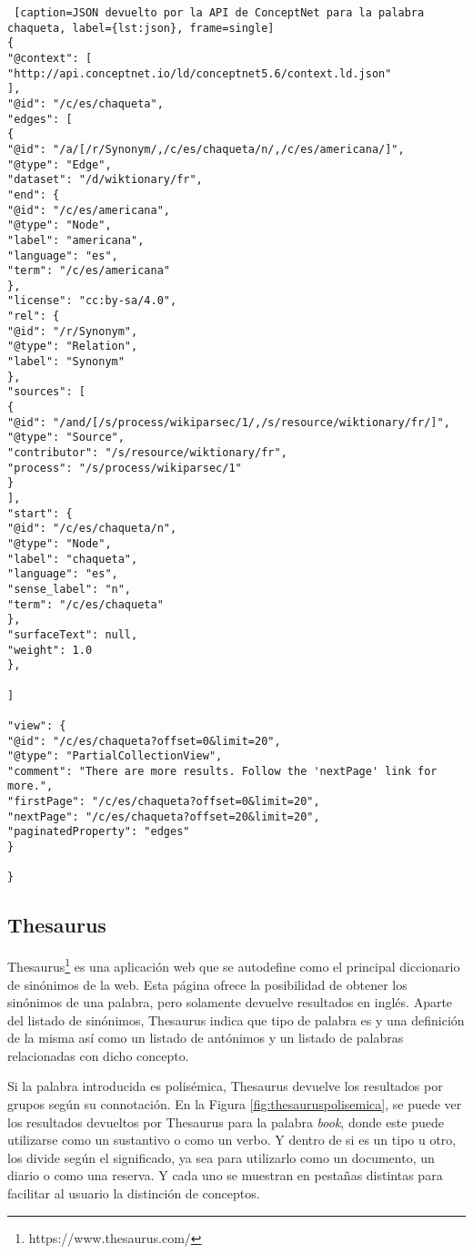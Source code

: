 \begin{lstlisting} [caption=JSON devuelto por la API de ConceptNet para la palabra chaqueta, label={lst:json}, frame=single]
{
"@context": [
"http://api.conceptnet.io/ld/conceptnet5.6/context.ld.json"
],
"@id": "/c/es/chaqueta",
"edges": [
{
"@id": "/a/[/r/Synonym/,/c/es/chaqueta/n/,/c/es/americana/]",
"@type": "Edge",
"dataset": "/d/wiktionary/fr",
"end": {
"@id": "/c/es/americana",
"@type": "Node",
"label": "americana",
"language": "es",
"term": "/c/es/americana"
},
"license": "cc:by-sa/4.0",
"rel": {
"@id": "/r/Synonym",
"@type": "Relation",
"label": "Synonym"
},
"sources": [
{
"@id": "/and/[/s/process/wikiparsec/1/,/s/resource/wiktionary/fr/]",
"@type": "Source",
"contributor": "/s/resource/wiktionary/fr",
"process": "/s/process/wikiparsec/1"
}
],
"start": {
"@id": "/c/es/chaqueta/n",
"@type": "Node",
"label": "chaqueta",
"language": "es",
"sense_label": "n",
"term": "/c/es/chaqueta"
},
"surfaceText": null,
"weight": 1.0
},

]

"view": {
"@id": "/c/es/chaqueta?offset=0&limit=20",
"@type": "PartialCollectionView",
"comment": "There are more results. Follow the 'nextPage' link for more.",
"firstPage": "/c/es/chaqueta?offset=0&limit=20",
"nextPage": "/c/es/chaqueta?offset=20&limit=20",
"paginatedProperty": "edges"
}

}
\end{lstlisting} 


\subsection{Thesaurus}
\label{cap:subsec:thesaurus}
Thesaurus\footnote{https://www.thesaurus.com/} es una aplicación web que se autodefine como el principal diccionario de sinónimos de la web. Esta página ofrece la posibilidad de obtener los sinónimos de una palabra, pero solamente devuelve resultados en inglés. Aparte del listado de sinónimos, Thesaurus indica que tipo de palabra es y una definición de la misma así como un listado de antónimos y un listado de palabras relacionadas con dicho concepto. 

Si la palabra introducida es polisémica, Thesaurus devuelve los resultados por grupos según su connotación. En la Figura \ref{fig:thesauruspolisemica}, se puede ver los resultados devueltos por Thesaurus para la palabra \textit{book}, donde este puede utilizarse como un sustantivo o como un verbo. Y dentro de si es un tipo u otro, los divide según el significado, ya sea para utilizarlo como un documento, un diario o como una reserva. Y cada uno se muestran en pestañas distintas para facilitar al usuario la distinción de conceptos.

